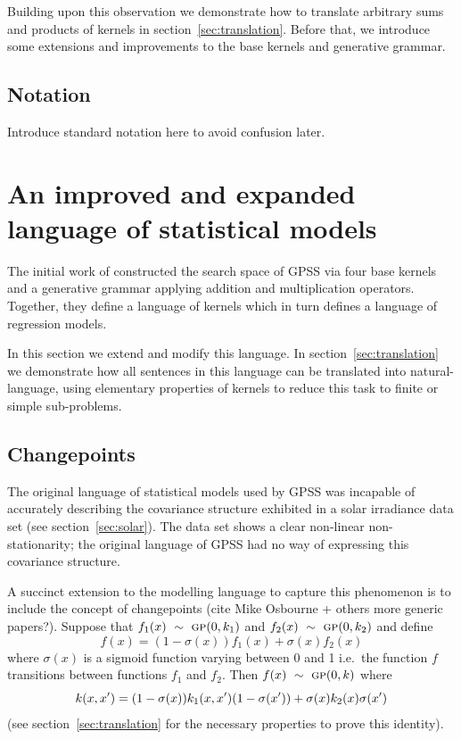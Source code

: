 \documentclass{article}
\def\ie{i.e.\ }
\begin{document}
Building upon this observation we demonstrate how to translate arbitrary sums and products of kernels in section~\ref{sec:translation}.
Before that, we introduce some extensions and improvements to the base kernels and generative grammar.

\subsection{Notation}

Introduce standard notation here to avoid confusion later.

\section{An improved and expanded language of statistical models}
\label{sec:improvements}

The initial work of \cite{DuvLloGroetal13} constructed the search space of GPSS via four base kernels and a generative grammar applying addition and multiplication operators.
Together, they define a language of kernels which in turn defines a language of regression models.

In this section we extend and modify this language.
In section~\ref{sec:translation} we demonstrate how all sentences in this language can be translated into natural-language, using elementary properties of kernels to reduce this task to finite or simple sub-problems.

\subsection{Changepoints}

The original language of statistical models used by GPSS was incapable of accurately describing the covariance structure exhibited in a solar irradiance data set (see section~\ref{sec:solar}).
The data set shows a clear non-linear non-stationarity; the original language of GPSS had no way of expressing this covariance structure.

A succinct extension to the modelling language to capture this phenomenon is to include the concept of changepoints (cite Mike Osbourne + others more generic papers?).
Suppose that $f_1(x) \ \sim\  {\textsc{gp}}{}(0, k_1)$ and $f_2(x) \ \sim\  {\textsc{gp}}{}(0, k_2)$ and define
\begin{equation}
f(x) = (1-\sigma(x))f_1(x) + \sigma(x)f_2(x)
\end{equation}
where $\sigma(x)$ is a sigmoid function varying between 0 and 1 \ie the function $f$ transitions between functions $f_1$ and $f_2$.
Then $f(x) \ \sim\  {\textsc{gp}}{}(0,k)$ where
\begin{equation}
\kernel(x,x') = (1-\sigma(x))k_1(x,x')(1-\sigma(x')) + \sigma(x)k_2(x)\sigma(x')
\label{eq:cp}
\end{equation}
(see section~\ref{sec:translation} for the necessary properties to prove this identity).
\end{document}
